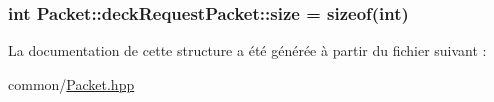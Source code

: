 \subsubsection[{size}]{\setlength{\rightskip}{0pt plus 5cm}int Packet\+::deck\+Request\+Packet\+::size = sizeof(int)}\label{structPacket_1_1deckRequestPacket_a21f7ca382cdcd158f55feddfde07149f}


La documentation de cette structure a été générée à partir du fichier suivant \+:\begin{DoxyCompactItemize}
\item 
common/\hyperlink{Packet_8hpp}{Packet.\+hpp}\end{DoxyCompactItemize}
